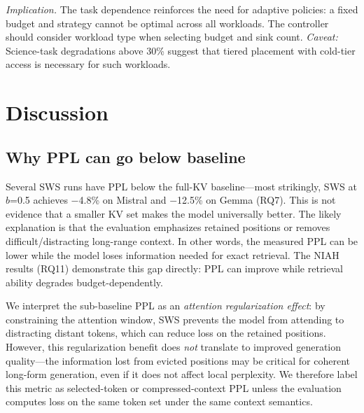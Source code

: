 \documentclass[11pt]{article}
\newcommand{\sws}{SWS}
\newcommand{\pct}{\%}
\theoremstyle{definition}
\theoremstyle{plain}
\begin{document}
\emph{Implication.}  The task dependence reinforces the need for adaptive policies: a fixed budget and strategy cannot be optimal across all workloads.  The controller should consider workload type when selecting budget and sink count.  \emph{Caveat:} Science-task degradations above 30\pct{} suggest that tiered placement with cold-tier access is necessary for such workloads.

\section{Discussion}
\label{sec:discussion}

\subsection{Why PPL can go below baseline}
Several \sws{} runs have PPL below the full-KV baseline---most strikingly, \sws{} at $b$=0.5 achieves $-$4.8\pct{} on Mistral and $-$12.5\pct{} on Gemma (RQ7).  This is not evidence that a smaller KV set makes the model universally better.  The likely explanation is that the evaluation emphasizes retained positions or removes difficult/distracting long-range context.  In other words, the measured PPL can be lower while the model loses information needed for exact retrieval.  The NIAH results (RQ11) demonstrate this gap directly: PPL can improve while retrieval ability degrades budget-dependently.

We interpret the sub-baseline PPL as an \emph{attention regularization effect}: by constraining the attention window, \sws{} prevents the model from attending to distracting distant tokens, which can reduce loss on the retained positions.  However, this regularization benefit does \emph{not} translate to improved generation quality---the information lost from evicted positions may be critical for coherent long-form generation, even if it does not affect local perplexity.  We therefore label this metric as selected-token or compressed-context PPL unless the evaluation computes loss on the same token set under the same context semantics.
\end{document}
